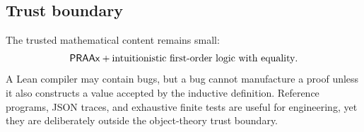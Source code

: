 \subsection{Trust boundary}

The trusted mathematical content remains small:
\[
  \mathsf{PRAAx} + \text{intuitionistic first-order logic with equality}.
\]
A Lean compiler may contain bugs, but a bug cannot manufacture a proof unless
it also constructs a value accepted by the inductive  definition.
Reference programs, JSON traces, and exhaustive finite tests are useful for
engineering, yet they are deliberately outside the object-theory trust
boundary.
